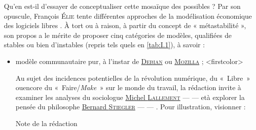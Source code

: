 Qu'en est-il d'essayer de conceptualiser cette mosaïque des possi\-bles ? Par son opuscule, François \textsc{Élie} tente différentes approches de la modélisation économique des logiciels libres \parencite{Elie:2009}. À tort ou à raison, à partir du concept de « métastabilité », son propos a le mérite de proposer cinq catégories de modèles, qualifiées de stables ou bien d'instables (repris tels quels en \cref{tab:I.1}), à savoir :
\begin{itemize}
	\item modèle communautaire pur, à l'instar de \href{https://www.debian.org/index.fr.html}{\textsc{Debian}} ou \href{https://foundation.mozilla.org/fr/}{\textsc{Mozilla}} ;
\caution[t]<firstcolor>{%
Au sujet des incidences potentielles de la révolution numérique, du «~Libre~» ou\linebreak encore du «~Faire/\textit{Make}~» sur le monde du travail, la rédaction invite à examiner les analyses du sociologue \href{./Videos/Chapter01/lallement-age-du-faire-2015.mp4}{Michel \textsc{Lallement}} ---  \parencite{Lallement:2015} --- et\linebreak à explorer la pensée du philosophe \href{./Videos/Chapter01/stiegler-societe-automatique-inria-2014.mp4}{Ber\-nard \textsc{Stiegler}} ---  \parencite{Stiegler:2015b} ---  \parencite{Stiegler:2015a}. Pour illustration, visionner :
}{Note de la rédaction}

\end{itemize}
